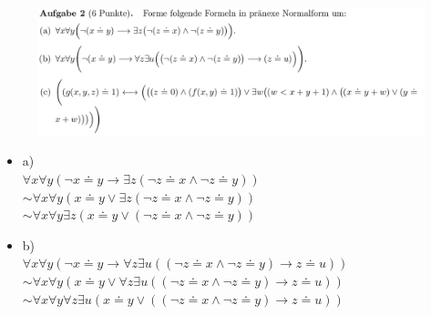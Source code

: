 \documentclass[a4paper]{scrartcl}
\begin{document}
    \begin{figure}[H]
        \centering
        \includegraphics[scale=0.3]{./A-2.png}
        \label{fig:}
    \end{figure}

    \begin{itemize}
        \item a)\\
            $\forall x \forall y (\neg x \doteq y \rightarrow \exists z (\neg z \doteq x \land \neg z \doteq y))$\\
            $\sim \forall x \forall y (x \doteq y \lor \exists z (\neg z \doteq x \land \neg z \doteq y))$\\
            $\sim \forall x \forall y \exists z (x \doteq y \lor (\neg z \doteq x \land \neg z \doteq y))$\\

        \item b)\\
            $\forall x \forall y (\neg x \doteq y \rightarrow \forall z \exists u ((\neg z \doteq x \land \neg z \doteq y) \rightarrow z \doteq u))$\\
            $\sim \forall x \forall y (x \doteq y \lor \forall z \exists u ((\neg z \doteq x \land \neg z \doteq y) \rightarrow z \doteq u))$\\
            $\sim \forall x \forall y \forall z \exists u (x \doteq y \lor ((\neg z \doteq x \land \neg z \doteq y) \rightarrow z \doteq u))$\\


\end{itemize}
\end{document}
